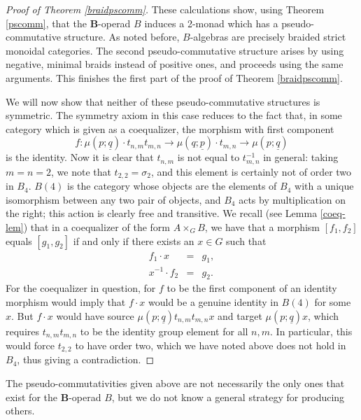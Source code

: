 \documentclass{amsbook} %
\newcommand{\mb}{\mathbf}
\numberwithin{section}{chapter}
\begin{document}
\begin{proof}[Proof of Theorem \ref{braidpscomm}]
These calculations show, using Theorem \ref{pscomm}, that the $\mb{B}$-operad $B$ induces a 2-monad which has a pseudo-commutative structure.  As noted before, $B$-algebras are precisely braided strict monoidal categories.  The second pseudo-commutative structure arises by using negative, minimal braids instead of positive ones, and proceeds using the same arguments.  This finishes the first part of the proof of Theorem \ref{braidpscomm}.

We will now show that neither of these pseudo-commutative structures is symmetric.  The symmetry axiom in this case reduces to the fact that, in some category which is given as a coequalizer, the morphism with first component
\[
f:\mu(p; \underline{q}) \cdot t_{n,m}t_{m,n} \rightarrow \mu(q; \underline{p}) \cdot t_{m,n} \rightarrow \mu(p; \underline{q})
\]
is the identity.  Now it is clear that $t_{n,m}$ is not equal to $t_{m,n}^{-1}$ in general: taking $m=n=2$, we note that $t_{2,2} = \sigma_{2}$, and this element is certainly not of order two in $B_{4}$.  $B(4)$ is the category whose objects are the elements of $B_{4}$ with a unique isomorphism between any two pair of objects, and $B_{4}$ acts by multiplication on the right; this action is clearly free and transitive.  We recall (see Lemma \ref{coeq-lem}) that in a coequalizer of the form $A \times_{G} B$, we have that a morphism $[f_{1}, f_{2}]$ equals $[g_{1}, g_{2}]$ if and only if there exists an $x \in G$ such that
\[
\begin{array}{rcl}
f_{1} \cdot x & = & g_{1}, \\
x^{-1} \cdot f_{2} & = & g_{2}.
\end{array}
\]
For the coequalizer in question, for $f$ to be the first component of an identity morphism would imply that $f \cdot x$ would be a genuine identity in $B(4)$ for some $x$.  But $f \cdot x$ would have source $\mu(p; \underline{q}) t_{n,m}t_{m,n}x$ and target $\mu(p; \underline{q})x$, which requires $t_{n,m}t_{m,n}$ to be the identity group element for all $n,m$.  In particular, this would force $t_{2,2}$ to have order two, which we have noted above does not hold in $B_{4}$, thus giving a contradiction.
\end{proof}

\begin{rem}
The pseudo-commutativities given above are not necessarily the only ones that exist for the $\mb{B}$-operad $B$, but we do not know a general strategy for producing others.
\end{rem}
\end{document}
